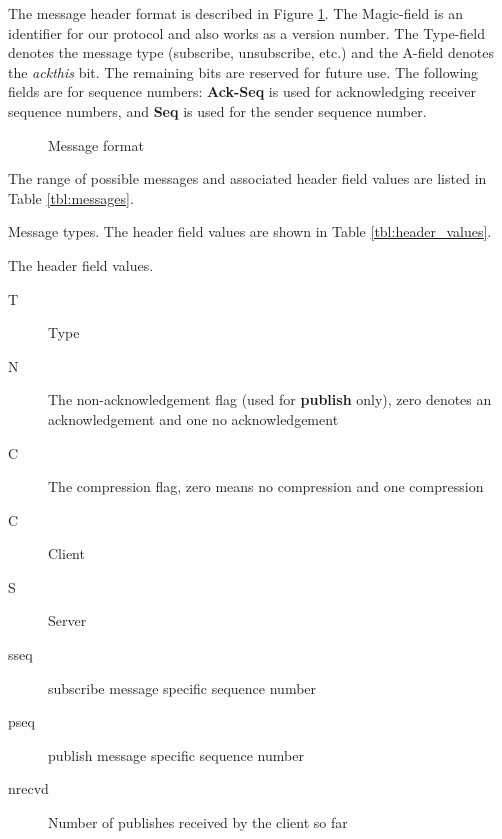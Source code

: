 \documentclass[a4paper]{article}
\begin{document}
The message header format is described in Figure \ref{fig:header}. The 
Magic-field is an identifier for our protocol and also works as a version
number. The Type-field denotes the message type (subscribe, unsubscribe, etc.)
and the A-field denotes the \textit{ackthis} bit. The remaining bits are reserved
for future use. The following fields are for sequence numbers: \textbf{Ack-Seq} 
is used for acknowledging receiver sequence numbers, and \textbf{Seq} is used 
for the sender sequence number.

\begin{figure}
	\begin{center}
		
		\caption{Message format}
		\label{fig:header}
	\end{center}
\end{figure}

The range of possible messages and associated header field values are listed in Table 
\ref{tbl:messages}.

\begin{table}
\begin{center}
\caption{Message types. The header field values are shown in Table \ref{tbl:header_values}.}

\label{tbl:messages}
\end{center}
\end{table}

\begin{table}
\caption{The header field values.}
\begin{description}
  \item[T] Type
  \item[N] The non-acknowledgement flag (used for \textbf{publish} only), zero
  denotes an acknowledgement and one no acknowledgement
  \item[C] The compression flag, zero means no compression and one compression
  \item[C] Client
  \item[S] Server
  \item[sseq] subscribe message specific sequence number
  \item[pseq] publish message specific sequence number
  \item[nrecvd] Number of publishes received by the client so far
\end{description}
\label{tbl:header_values}
\end{table}

\pagebreak
\end{document}
